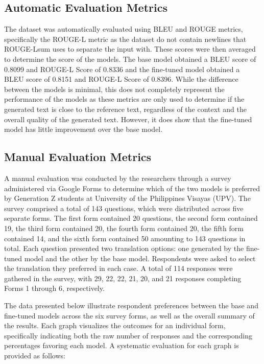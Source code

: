 \subsection{Automatic Evaluation Metrics}
The dataset was automatically evaluated using BLEU and ROUGE metrics, specifically the ROUGE-L metric as the dataset do not contain newlines that ROUGE-Lsum uses to separate the input with. These scores were then averaged to determine the score of the models. The base model obtained a BLEU score of 0.8099 and ROUGE-L Score of 0.8336 and the fine-tuned model obtained a BLEU score of 0.8151 and ROUGE-L Score of 0.8396. While the difference between the models is minimal, this does not completely represent the performance of the models as these metrics are only used to determine if the generated text is close to the reference text, regardless of the context and the overall quality of the generated text. However, it does show that the fine-tuned model has little improvement over the base model.

\subsection{Manual Evaluation Metrics}
A manual evaluation was conducted by the researchers through a survey administered via Google Forms to determine which of the two models is preferred by Generation Z students at University of the Philippines Visayas (UPV). The survey comprised a total of 143 questions, which were distributed across five separate forms. The first form contained 20 questions, the second form contained 19, the third form contained 20, the fourth form contained 20, the fifth form contained 14, and the sixth form contained 50 amounting to 143 questions in total. Each question presented two translation options: one generated by the fine-tuned model and the other by the base model. Respondents were asked to select the translation they preferred in each case. A total of 114 responses were gathered in the survey, with 29, 22, 22, 21, 20, and 21 responses completing Forms 1 through 6, respectively.

The data presented below illustrate respondent preferences between the base and fine-tuned models across the six survey forms, as well as the overall summary of the results. Each graph visualizes the outcomes for an individual form, specifically indicating both the raw number of responses and the corresponding percentages favoring each model. A systematic evaluation for each graph is provided as follows:

